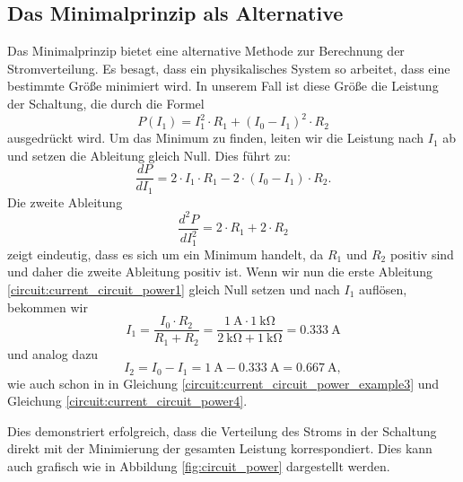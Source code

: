 \subsection{Das Minimalprinzip als Alternative} 
Das Minimalprinzip bietet eine alternative Methode zur Berechnung der Stromverteilung. Es besagt, dass ein physikalisches System so arbeitet, dass eine bestimmte Größe minimiert wird. In unserem Fall ist diese Größe die Leistung der Schaltung, die durch die Formel
\begin{equation}
	P(I_1)=  I_1^2 \cdot R_1+  (I_0-I_1)^2 \cdot R_2
	\label{circuit:current_circuit_power}
\end{equation}
ausgedrückt wird. Um das Minimum zu finden, leiten wir die Leistung nach $I_1$ ab und setzen die Ableitung gleich Null. Dies führt zu:
\begin{equation}
	\frac{dP}{dI_1} = 2\cdot I_1\cdot R_1 - 2\cdot (I_0 - I_1) \cdot R_2.
	\label{circuit:current_circuit_power1}
\end{equation}
Die zweite Ableitung 
\begin{equation}
	\frac{d^2P}{dI_1^2} = 2\cdot R_1 + 2\cdot R_2
	\label{circuit:current_circuit_power2}
\end{equation}
zeigt eindeutig, dass es sich um ein Minimum handelt, da $R_1$ und $R_2$ positiv sind und daher die zweite Ableitung positiv ist. Wenn wir nun die erste Ableitung \eqref{circuit:current_circuit_power1} gleich Null setzen und nach $I_1$ auflösen, bekommen wir
\begin{equation}
	I_1 = \frac{I_0 \cdot R_2}{R_1 + R_2} = \frac{\SI{1}{\ampere} \cdot \SI{1}{\kilo\ohm}}{\SI{2}{\kilo\ohm}+ \SI{1}{\kilo\ohm}}=\SI{0.333}{\ampere}
	\label{circuit:current_circuit_power_a}
\end{equation}
und analog dazu
\begin{equation}
	I_2 = I_0-I_1=\SI{1}{\ampere}-\SI{0.333}{\ampere}=\SI{0.667}{\ampere},
	\label{circuit:current_circuit_power_b}
\end{equation}
wie auch schon in in Gleichung \eqref{circuit:current_circuit_power_example3} und Gleichung \eqref{circuit:current_circuit_power4}.

Dies demonstriert erfolgreich, dass die Verteilung des Stroms in der Schaltung direkt mit der Minimierung der gesamten Leistung korrespondiert. Dies kann auch grafisch wie in Abbildung \ref{fig:circuit_power} dargestellt werden.

